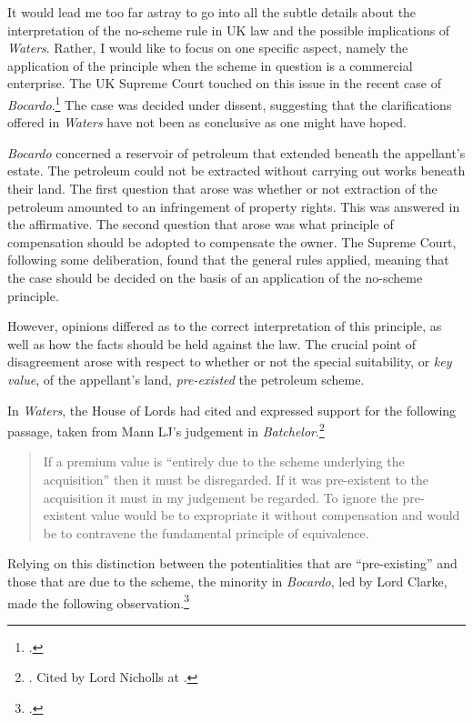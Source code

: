 It would lead me too far astray to go into all the subtle details about the interpretation of the no-scheme rule in UK law and the possible implications of \emph{Waters}. Rather, I would like to focus on one specific aspect, namely the application of the principle when the scheme in question is a commercial enterprise. The UK Supreme Court touched on this issue in the recent case of  \emph{Bocardo}.\footnote{\cite{bocardo10}.} The case was decided under dissent, suggesting that the clarifications offered in \emph{Waters} have not been as conclusive as one might have hoped.

\emph{Bocardo} concerned a reservoir of petroleum that extended beneath the appellant's estate. The petroleum could not be extracted without carrying out works beneath their land. The first question that arose was whether or not extraction of the petroleum amounted to an infringement of property rights. This was answered in the affirmative. The second question that arose was what principle of compensation should be adopted to compensate the owner. The Supreme Court, following some deliberation, found that the general rules applied, meaning that the case should be decided on the basis of an application of the no-scheme principle.

However, opinions differed as to the correct interpretation of this principle, as well as how the facts should be held against the law. The crucial point of disagreement arose with respect to whether or not the special suitability, or \emph{key value}, of the appellant's land, \emph{pre-existed} the petroleum scheme.

In \emph{Waters}, the House of Lords had cited and expressed support for the following passage, taken from Mann LJ's judgement in \emph{Batchelor}.\footnote{\cite[361]{batchelor89}. Cited by Lord Nicholls at \cite[65]{waters04}.}

\begin{quote}
If a premium value is ``entirely due to the scheme underlying the acquisition'' then it must be disregarded. If it was pre-existent to the acquisition it must in my judgement be regarded. To ignore the pre-existent value would be to expropriate it without compensation and would be to contravene the fundamental principle of equivalence.
\end{quote}

Relying on this distinction between the potentialities that are ``pre-existing'' and those that are due to the scheme, the minority in \emph{Bocardo}, led by Lord Clarke, made the following observation.\footcite[42]{bocardo10}

